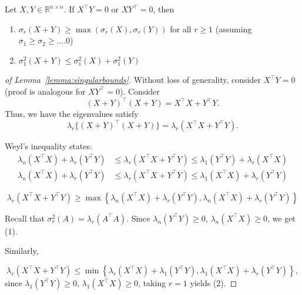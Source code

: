 \documentclass[10pt,a4paper]{amsart}
\def\R{\mathbb{R}} %
\begin{document}
\begin{lemma}\label{lemma:singularbounds} Let $X, Y\in \R^{n \times n}$. If $X^{\top}Y = 0$ or $XY^{\top} = 0$, then
\begin{enumerate}
\item $\sigma_r(X+Y)\geq \max(\sigma_r(X), \sigma_r(Y))$ for all $r\geq 1$ (assuming $\sigma_1 \geq \sigma_2\geq ....0$)
\item $\sigma_1^2(X+Y) \leq \sigma_1^2(X) + \sigma_1^2(Y)$
\end{enumerate}
\end{lemma}

\begin{proof}[of Lemma~\ref{lemma:singularbounds}]
Without loss of generality, consider $X^{\top}Y = 0$ (proof is analogous for $XY^{\top} = 0$). Consider
$$
(X+Y)^{\top}(X+Y) = X^{\top}X + Y^{\top}Y.
$$
Thus, we have the eigenvalues satisfy
$$
\lambda_r\{(X+Y)^{\top}(X+Y) \} = \lambda_r(X^{\top}X + Y^{\top}Y).
$$

Weyl's inequality states:
\begin{align*}
    \lambda_n(X^{\top}X) +  \lambda_r(Y^{\top}Y) & \leq \lambda_r(X^{\top}X + Y^{\top}Y) \leq \lambda_1(Y^{\top}Y) +  \lambda_r(X^{\top}X) \\
    \lambda_n(X^{\top}X) +  \lambda_r(Y^{\top}Y) & \leq \lambda_r(X^{\top}X + Y^{\top}Y) \leq \lambda_1(X^{\top}X) +  \lambda_r(Y^{\top}Y) 
\end{align*}
{
$$
\lambda_r(X^{\top}X + Y^{\top}Y) \geq \max\left\{ \lambda_n(X^{\top}X) +  \lambda_r(Y^{\top}Y),  \lambda_n(X^{\top}X) +  \lambda_r(Y^{\top}Y)\right\}
$$

Recall that $\sigma^2_r(A) = \lambda_r(A^{\top}A)$. Since $\lambda_n(Y^{\top}Y) \geq 0$, $\lambda_n(X^{\top}X)\geq 0$, we get (1).

 Similarly,}
$$
\lambda_r(X^{\top}X + Y^{\top}Y) \leq \min\left\{\lambda_r(X^{\top}X) + \lambda_1(Y^{\top}Y), \lambda_1(X^{\top}X) + \lambda_r(Y^{\top}Y)\right\},
$$
 since $\lambda_1(Y^{\top}Y) \geq 0$, $\lambda_1(X^{\top}X)\geq 0$, taking $r=1$ yields (2).
\end{proof}
\end{document}

